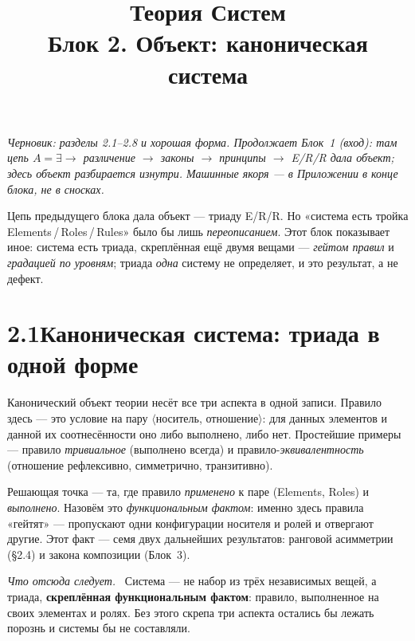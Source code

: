 \documentclass[12pt,a4paper]{article}
\title{\textbf{Теория Систем}\\[2mm]\large Блок 2. Объект: каноническая система}
\author{}
\date{}
\newcommand{\rezultat}{\medskip\noindent\emph{Что отсюда следует.}\ }
\begin{document}
\maketitle
\thispagestyle{empty}

\noindent\small\textit{Черновик: разделы 2.1--2.8 и хорошая форма. Продолжает Блок~1 (вход):
там цепь $A=\exists \to$ различение $\to$ законы $\to$ принципы $\to$ E/R/R дала объект; здесь
объект разбирается изнутри. Машинные якоря --- в Приложении в конце блока, не в сносках.}\normalsize

\bigskip

\noindent Цепь предыдущего блока дала объект --- триаду E/R/R. Но «система есть тройка
Elements\,/\,Roles\,/\,Rules» было бы лишь \emph{переописанием}. Этот блок показывает иное:
система есть триада, скреплённая ещё двумя вещами --- \emph{гейтом правил} и \emph{градацией по
уровням}; триада \emph{одна} систему не определяет, и это результат, а не дефект.

\section*{2.1\quad Каноническая система: триада в одной форме}

Канонический объект теории несёт все три аспекта в одной записи. Правило здесь --- это условие
на пару $\langle$носитель, отношение$\rangle$: для данных элементов и данной их соотнесённости
оно либо выполнено, либо нет. Простейшие примеры --- правило \emph{тривиальное} (выполнено
всегда) и правило-\emph{эквивалентность} (отношение рефлексивно, симметрично, транзитивно).

Решающая точка --- та, где правило \emph{применено} к паре (Elements, Roles) и \emph{выполнено}.
Назовём это \emph{функциональным фактом}: именно здесь правила «гейтят» --- пропускают одни
конфигурации носителя и ролей и отвергают другие. Этот факт --- семя двух дальнейших
результатов: ранговой асимметрии (§2.4) и закона композиции (Блок~3).

\rezultat
Система --- не набор из трёх независимых вещей, а триада, \textbf{скреплённая функциональным
фактом}: правило, выполненное на своих элементах и ролях. Без этого скрепа три аспекта остались
бы лежать порознь и системы бы не составляли.

\end{document}
